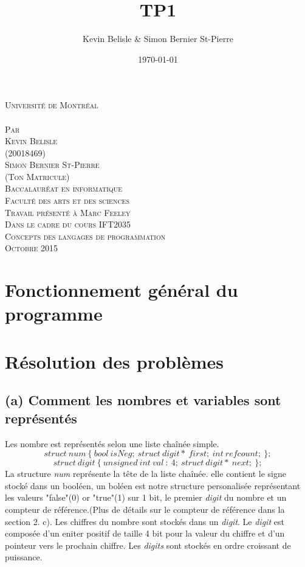 \documentclass[a4paper,12pt]{article}
\date{\today}
\author{Kevin Belisle \& Simon Bernier St-Pierre}
\title{TP1}
\newcommand{\Teacher}{Marc Feeley}
\newcommand{\ClassNum}{IFT2035}
\newcommand{\ClassName}{Concepts des langages de programmation}
\newcommand{\DateMMMMYYYY}{Octobre 2015}
\newcommand{\Author}{Kevin Belisle}
\newcommand{\Authorr}{Simon Bernier St-Pierre}
\begin{document}
\begin{titlepage}
	\begin{center}
		\textsc{\normalsize Université de Montréal}\\[2.5cm]

		\textsc{\LARGE \@title}\\[2.5cm]

		\textsc{\small Par}\\[0.25cm]
		\textsc{\LARGE \Author}\\[0.25cm]
		\textsc{\normalsize (20018469)}\\[0.25cm]
		\textsc{\LARGE \Authorr}\\[0.25cm]
		\textsc{\normalsize (Ton Matricule)}\\[2.5cm]

		\textsc{\normalsize Baccalauréat en informatique}\\
		\textsc{\normalsize Faculté des arts et des sciences}\\[2.5cm]

		\textsc{\small Travail présenté à \Teacher}\\
		\textsc{\small Dans le cadre du cours \ClassNum}\\
		\textsc{\small \ClassName}\\[2.5cm]

		\textsc{\normalsize \DateMMMMYYYY}\\[1.5cm]
	\end{center}
\end{titlepage}
\section{Fonctionnement général du programme}

\section{Résolution des problèmes}
	\subsection{(a) Comment les nombres et variables sont représentés}
		Les nombre est représentés selon une liste chaînée simple.
		\[ struct\:num\:\{\:bool\:isNeg;\:struct\:digit*\:first;\:int\:refcount;\:\}; \]
		\[ struct\:digit\:\{\:unsigned\:int\:val\::\:4;\:struct\:digit*\:next;\:\};\]
		La structure \textit{num} représente la tête de la liste chaînée. elle contient le signe stocké dans un booléen, un boléen est notre structure personalisée représentant les valeurs "false"(0) or "true"(1) sur 1 bit, le premier \textit{digit} du nombre et un compteur de référence.(Plus de détails sur le compteur de référence dans la section 2. c). Les chiffres du nombre sont stockés dans un \textit{digit}. Le \textit{digit} est composée d'un eniter positif de taille 4 bit pour la valeur du chiffre et d'un pointeur vers le prochain chiffre. Les \textit{digits} sont stockés en ordre croissant de puissance.\\
\end{document}
